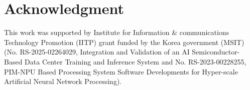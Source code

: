 \documentclass[conference]{IEEEtran}
\begin{document}






















\section*{Acknowledgment}
This work was supported by Institute for Information \& communications Technology Promotion (IITP) grant funded by the Korea government (MSIT) (No. RS-2025-02264029, Integration and Validation of an AI Semiconductor-Based Data Center Training and Inference System and No. RS-2023-00228255, PIM-NPU Based Processing System Software Developments for Hyper-scale Artificial Neural Network Processing).





\end{document}
